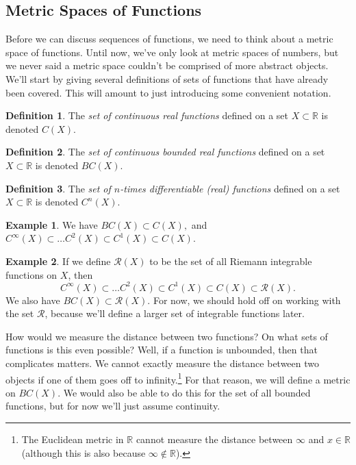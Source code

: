 \documentclass{article}
\newcommand{\R}{\mathbb{R}}
\theoremstyle{definition}
\newtheorem{definition}{Definition}[section]
\newtheorem{example}{Example}[section]
\begin{document}
\subsection{Metric Spaces of Functions}
Before we can discuss sequences of functions, we need to think about a metric space of functions. Until now, we've only look at metric spaces of numbers, but we never said a metric space couldn't be comprised of more abstract objects. We'll start by giving several definitions of sets of functions that have already been covered. This will amount to just introducing some convenient notation.
\begin{definition}
	The \textit{\color{red}set of continuous real functions} defined on a set $ X\subset\R $ is denoted $ C(X)$. 
\end{definition}
\begin{definition}
	The \textit{\color{red}set of continuous bounded real functions} defined on a set $ X\subset\R $ is denoted $ BC(X)$. 
\end{definition}
\begin{definition}
	The \textit{\color{red}set of $ n $-times differentiable (real) functions} defined on a set $ X\subset\R $ is denoted $ C^n(X) $. 
\end{definition}
\begin{example}
	We have $ BC(X)\subset C(X),$ and $C^\infty(X)\subset\ldots C^2(X)\subset C^1(X)\subset C(X) .$
\end{example}
\begin{example}
	If we define $ \mathscr{R}(X) $ to be the set of all Riemann integrable functions on $ X $, then $$C^\infty(X)\subset\ldots C^2(X)\subset C^1(X)\subset C(X)\subset\mathscr{R}(X) .$$ We also have $ BC(X)\subset\mathscr{R}(X) $. For now, we should hold off on working with the set $ \mathscr{R} $, because we'll define a larger set of integrable functions later. 
\end{example}
How would we measure the distance between two functions? On what sets of functions is this even possible? Well, if a function is unbounded, then that complicates matters. We cannot exactly measure the distance between two objects if one of them goes off to infinity.\footnote{The Euclidean metric in $ \R $ cannot measure the distance between $ \infty $ and $ x\in\R $ (although this is also because $ \infty\notin\R $). } For that reason, we will define a metric on $ BC(X) $. We would also be able to do this for the set of all bounded functions, but for now we'll just assume continuity. 
\end{document}

